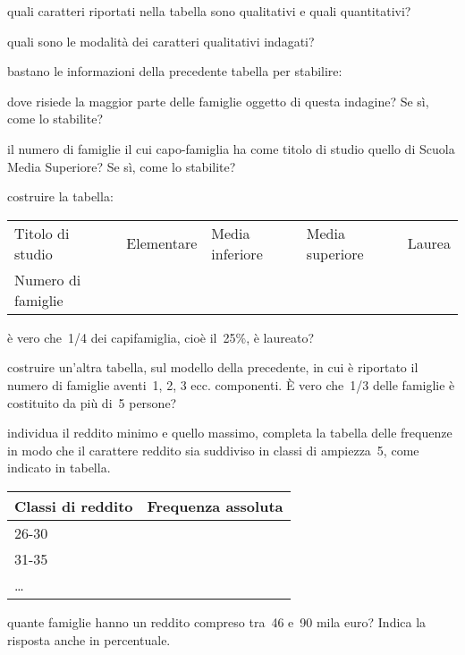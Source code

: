 \begin{esercizio}
\begin{itemize*}
\item quali caratteri riportati nella tabella sono qualitativi e quali quantitativi?
\item quali sono le modalità dei caratteri qualitativi indagati?
\item bastano le informazioni della precedente tabella per stabilire:
\begin{itemize*}
\item dove risiede la maggior parte delle famiglie oggetto di questa indagine? Se sì, come lo stabilite?
\item il numero di famiglie il cui capo-famiglia ha come titolo di studio quello di Scuola Media Superiore? Se sì, come lo stabilite?
\end{itemize*}
\item costruire la tabella:
\begin{center}
 \begin{tabular}{lllll}
\toprule
Titolo di studio & Elementare & Media inferiore & Media superiore & Laurea \\
Numero di famiglie & & & & \\
\bottomrule
\end{tabular}
\end{center}
\item è vero che~1/4 dei capifamiglia, cioè il~25\%, è laureato?
\item costruire un'altra tabella, sul modello della precedente, in cui è riportato il numero di famiglie aventi~1, 2, 3 ecc. componenti.
È vero che~1/3 delle famiglie è costituito da più di~5 persone?
\item individua il reddito minimo e quello massimo, completa la tabella delle frequenze in modo che il carattere reddito
sia suddiviso in classi di ampiezza~5, come indicato in tabella.
\begin{center}
\begin{tabular}{ll}
\toprule
Classi di reddito & Frequenza assoluta \\
\midrule
26-30 &  \\
31-35 &  \\
\ldots   &  \\
\bottomrule
\end{tabular}
\end{center}
\item quante famiglie hanno un reddito compreso tra~46 e~90 mila euro? Indica la risposta anche in percentuale.
\end{itemize*}
\end{esercizio}

